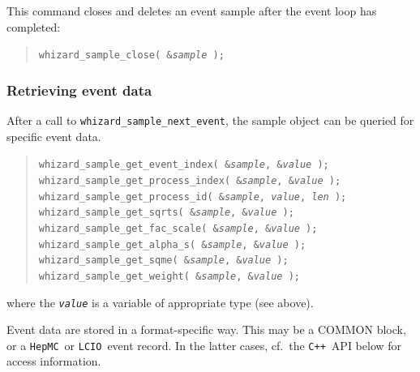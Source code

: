 \documentclass[12pt]{book}
\newcommand{\ttt}[1]{\texttt{#1}}
\newcommand{\lcio}{\ttt{LCIO}}
\newcommand{\hepmc}{\ttt{HepMC}}
\newcommand{\cpp}{\ttt{C++}}
\begin{document}
This command closes and deletes an event sample after the event loop has
completed:
\begin{quote}
  \tt whizard\_sample\_close( \&\textit{sample} );
\end{quote}

\subsubsection{Retrieving event data}

After a call to \ttt{whizard\_sample\_next\_event}, the sample object can be
queried for specific event data.
\begin{quote}
  \tt whizard\_sample\_get\_event\_index( \&\textit{sample}, \&\textit{value} );
  \\
  \tt whizard\_sample\_get\_process\_index( \&\textit{sample}, \&\textit{value} );
  \\
  \tt whizard\_sample\_get\_process\_id( \&\textit{sample}, \textit{value}, \textit{len} );
  \\
  \tt whizard\_sample\_get\_sqrts( \&\textit{sample}, \&\textit{value} );
  \\
  \tt whizard\_sample\_get\_fac\_scale( \&\textit{sample}, \&\textit{value} );
  \\
  \tt whizard\_sample\_get\_alpha\_s( \&\textit{sample}, \&\textit{value} );
  \\
  \tt whizard\_sample\_get\_sqme( \&\textit{sample}, \&\textit{value} );
  \\
  \tt whizard\_sample\_get\_weight( \&\textit{sample}, \&\textit{value} );
\end{quote}
where the \ttt{\it value} is a variable of appropriate type (see above).

Event data are stored in a format-specific way.  This may be a COMMON block,
or a \hepmc\ or \lcio\ event record.  In the latter cases, cf.\ the \cpp\ API
below for access information.
\end{document}
